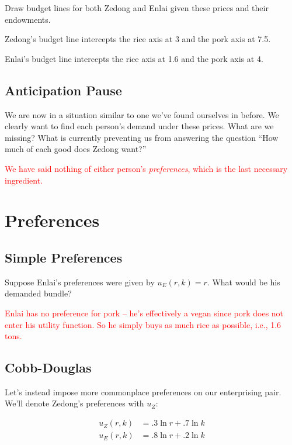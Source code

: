\documentclass{article}
\begin{document}
Draw budget lines for both Zedong and Enlai given these prices and their endowments. 

\color{red}

Zedong's budget line intercepts the rice axis at 3 and the pork axis at 7.5.

Enlai's budget line intercepts the rice axis at 1.6 and the pork axis at 4.

\color{black}  

\subsection{Anticipation Pause}

We are now in a situation similar to one we've found ourselves in before. We clearly want to find each person's demand under these prices. What are we missing? What is currently preventing us from answering the question ``How much of each good does Zedong want?''

\textcolor{red}{We have said nothing of either person's \textit{preferences}, which is the last necessary ingredient.} 

\section{Preferences}

\subsection{Simple Preferences}

Suppose Enlai's preferences were given by $u_E(r, k) = r$. What would be his demanded bundle?

\textcolor{red}{Enlai has no preference for pork -- he's effectively a vegan since pork does not enter his utility function. So he simply buys as much rice as possible, i.e., 1.6 tons.} 

\subsection{Cobb-Douglas}

Let's instead impose more commonplace preferences on our enterprising pair. We'll denote Zedong's preferences with $u_Z$:

\begin{align*}
u_Z(r, k) &= .3 \ln r + .7 \ln k \\
u_E(r, k) &= .8 \ln r + .2 \ln k
\end{align*}
\end{document}
